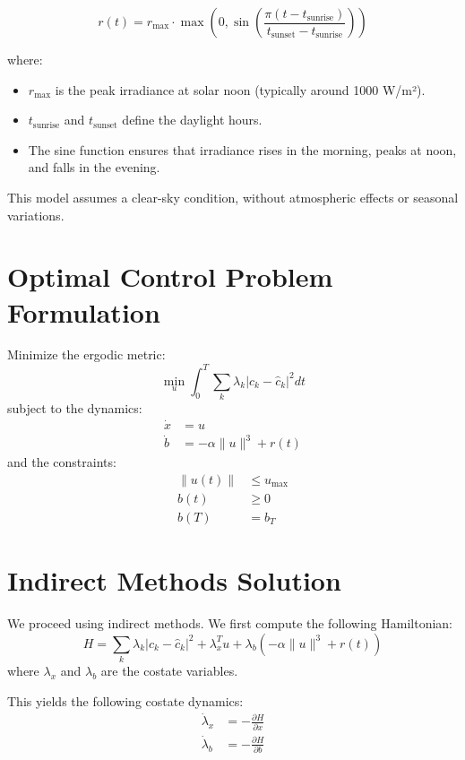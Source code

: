 \documentclass{article}
\begin{document}
\begin{equation}
    r(t) = r_{\max} \cdot \max\left(0, \sin\left(\frac{\pi (t - t_{\text{sunrise}})}{t_{\text{sunset}} - t_{\text{sunrise}}} \right) \right)
\end{equation}

where:
\begin{itemize}
    \item \( r_{\max} \) is the peak irradiance at solar noon (typically around 1000 W/m²).
    \item \( t_{\text{sunrise}} \) and \( t_{\text{sunset}} \) define the daylight hours.
    \item The sine function ensures that irradiance rises in the morning, peaks at noon, and falls in the evening.
\end{itemize}

This model assumes a clear-sky condition, without atmospheric effects or seasonal variations.

\section{Optimal Control Problem Formulation}
Minimize the ergodic metric:
\begin{equation}
    \min_u \int_0^T \sum_k \lambda_k \left| c_k - \hat{c}_k \right|^2 dt
\end{equation}
subject to the dynamics:
\begin{align}
    \dot{x} &= u \\
    \dot{b} &= - \alpha \|u\|^3 + r(t)
\end{align}
and the constraints:
\begin{align}
    \|u(t)\| &\leq u_{\max} \\
    b(t) &\geq 0 \\
    b(T) &= b_T
\end{align}

\section{Indirect Methods Solution}
We proceed using indirect methods. We first compute the following Hamiltonian:
\begin{equation}
   H = \sum_k \lambda_k \left| c_k - \hat{c}_k \right|^2 + \lambda_x^T u + \lambda_{b} \left( - \alpha \|u\|^3 + r(t) \right)
\end{equation}
where $\lambda_x$ and $\lambda_{b}$ are the costate variables.

This yields the following costate dynamics:
\begin{align}
   \dot{\lambda}_x &= -\frac{\partial H}{\partial x} \\
   \dot{\lambda}_{b} &= -\frac{\partial H}{\partial b}
\end{align}
   
\end{document}
